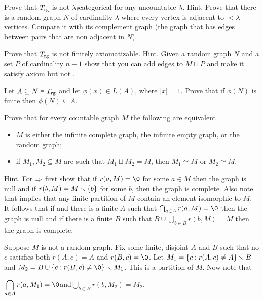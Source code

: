 \documentclass[creche.tex]{subfiles}
\begin{document}
%

\begin{exercise}
Prove that $T_{\rm rg}$ is not $\lambda\jj$categorical for any uncountable $\lambda$. Hint. Prove that there is a random graph $N$ of cardinality $\lambda$ where every vertex is adjacent to $<\lambda$ vertices. Compare it with its complement graph (the graph that has edges between pairs that are non adjacent in $N$).\QED
\end{exercise}

\begin{exercise}
Prove that $T_{\rm rg}$ is not finitely axiomatizable. Hint. Given a random graph $N$ and a set $P$ of cardinality $n+1$ show that you can add edges to $M\sqcup P$ and make it satisfy axiom  but not .\QED
\end{exercise}

\begin{exercise}\label{ex_rg_small_def_set}
Let $A\subseteq N\models T_{\rm rg}$ and let $\phi(x)\in L(A)$, where $|x|=1$. Prove that if $\phi(N)$ is finite then $\phi(N)\subseteq A$.\QED
\end{exercise}

\begin{exercise}
Prove that for every countable graph $M$ the following are equivalent
\begin{itemize}
\item[1.] $M$ is either the infinite complete graph, the infinite empty graph, or the random graph;
\item[2.] if $M_1,M_2\subseteq M$ are such that $M_1\sqcup M_2=M$, then $M_1\simeq M$ or $M_2\simeq M$.
\end{itemize}
Hint. For $\IMP$ first show that if $r(a,M)=\0$ for some $a\in M$ then the graph is null and if $r(b,M)=M\sm\{b\}$ for some $b$, then the graph is complete. Also note that  implies that any finite partition of $M$ contain an element isomorphic to $M$. It follows that if  and there is a finite $A$ such that $\bigcap_{a\in A}r(a, M)=\0$ then the graph is null and if there is a finite $B$ such that $B\cup\bigcup_{b\in B}r(b,M)=M$ then the graph is complete. 

Suppose $M$ is not a random graph. Fix some finite, disjoint $A$ and $B$ such that no $c$ satisfies both $r(A,c)= A$ and $r(B,c)=\0$. Let $M_1=\{c:r(A,c)\neq A\}\sm B$ and $M_2=B\cup\{c:r(B,c)\neq\0\}\sm M_1$. This is a partition of $M$. Now note that 

\hfill$\displaystyle\bigcap_{a\in A}r(a, M_1)=\0$\hfill and\hfill $\displaystyle\bigcup_{b\in B}r(b, M_2)=M_2$.\QED
\end{exercise}
\end{document}
